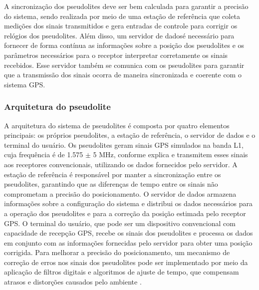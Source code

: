 A sincronização dos pseudolites deve ser bem calculada para garantir a precisão do sistema, sendo realizada por meio de uma estação de referência que coleta medições dos sinais transmitidos e gera entradas de controle para corrigir os relógios dos pseudolites. Além disso, um servidor de dadosé necessário para fornecer de forma contínua as informações sobre a posição dos pseudolites e os parâmetros necessários para o receptor interpretar corretamente os sinais recebidos. Esse servidor também se comunica com os pseudolites para garantir que a transmissão dos sinais ocorra de maneira sincronizada e coerente com o sistema GPS.

\subsubsection{Arquitetura do pseudolite}

A arquitetura do sistema de pseudolites é composta por quatro elementos principais: os próprios pseudolites, a estação de referência, o servidor de dados e o terminal do usuário. Os pseudolites geram sinais GPS simulados na banda L1, cuja frequência é de 1.575 $\pm$ 5 MHz, conforme explica \citep{wang2018} e transmitem esses sinais aos receptores convencionais, utilizando os dados fornecidos pelo servidor.
A estação de referência é responsável por manter a sincronização entre os pseudolites, garantindo que as diferenças de tempo entre os sinais não comprometam a precisão do posicionamento. O servidor de dados armazena informações sobre a configuração do sistema e distribui os dados necessários para a operação dos pseudolites e para a correção da posição estimada pelo receptor GPS. O terminal do usuário, que pode ser um dispositivo convencional com capacidade de recepção GPS, recebe os sinais dos pseudolites e processa os dados em conjunto com as informações fornecidas pelo servidor para obter uma posição corrigida.
Para melhorar a precisão do posicionamento, um mecanismo de correção de erros nos sinais dos pseudolites pode ser implementado por meio da aplicação de filtros digitais e algoritmos de ajuste de tempo, que compensam atrasos e distorções causados pelo ambiente \citep{kim2014}.